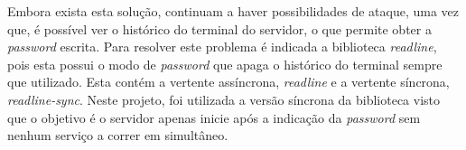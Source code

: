 Embora exista esta solução, continuam a haver possibilidades de ataque, uma vez que, é possível ver o histórico do terminal do servidor, o que permite obter a \textit{\textit{password}} escrita. Para resolver este problema é indicada a biblioteca \textit{readline}, pois esta possui o modo de \textit{\textit{password}} que apaga o histórico do terminal sempre que utilizado. Esta contém a vertente assíncrona, \textit{readline} e a vertente síncrona, \textit{readline-sync}. Neste projeto, foi utilizada a versão síncrona da biblioteca visto que o objetivo é o servidor apenas inicie após a indicação da \textit{\textit{password}} sem nenhum serviço a correr em simultâneo.